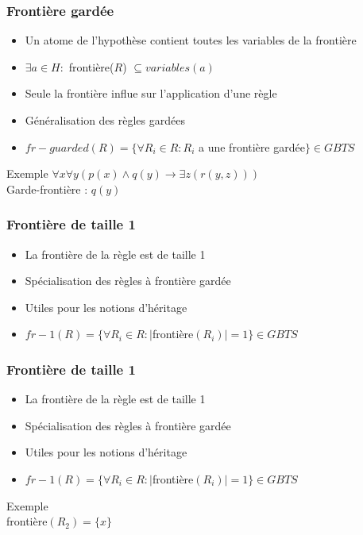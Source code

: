 \begin{frame}
	\frametitle{Frontière gardée}
	\begin{itemize}
		\item Un atome de l'hypothèse contient toutes les variables de la frontière
		\item $\exists a \in H :$ frontière($R$) $\subseteq variables(a)$
		\item Seule la frontière influe sur l'application d'une règle
		\item Généralisation des règles gardées
		\item $fr-guarded(R) = \{\forall R_i \in R : R_i $ a une frontière gardée$\} \in GBTS$
	\end{itemize}
	\vspace{10mm}
	\begin{exampleblock}{Exemple}
		$\forall x \forall y (p(x) \wedge q(y) \rightarrow \exists z (r(y,z)))$\\
		Garde-frontière : $q(y)$
	\end{exampleblock}
\end{frame}

\begin{frame}
	\frametitle{Frontière de taille 1}
	\begin{itemize}
		\item La frontière de la règle est de taille 1
		\item Spécialisation des règles à frontière gardée
		\item Utiles pour les notions d'héritage
		\item $fr-1(R) = \{\forall R_i \in R : |$frontière$(R_i)| = 1 \} \in GBTS$
	\end{itemize}
	\vspace{10mm}
\end{frame}

\begin{frame}
	\frametitle{Frontière de taille 1}
	\begin{itemize}
		\item La frontière de la règle est de taille 1
		\item Spécialisation des règles à frontière gardée
		\item Utiles pour les notions d'héritage
		\item $fr-1(R) = \{\forall R_i \in R : |$frontière$(R_i)| = 1 \} \in GBTS$
	\end{itemize}
	\vspace{10mm}
	\begin{exampleblock}{Exemple}
		 \\
		frontière$(R_2) = \{x\}$
	\end{exampleblock}
\end{frame}

